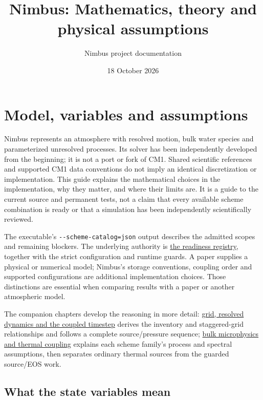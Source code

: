 \documentclass[
  11pt,
]{report}
\title{Nimbus: Mathematics, theory and physical assumptions}
\author{Nimbus project documentation}
\date{18 October 2026}
\begin{document}
\hypersetup{pageanchor=false}
\maketitle
\hypersetup{pageanchor=true}

{
\small
\setlength{\parskip}{0pt}
\setcounter{tocdepth}{1}
\tableofcontents
}
\clearpage
{}
\pagestyle{fancy}
\chapter{Model, variables and
assumptions}\label{model-variables-and-assumptions}

Nimbus represents an atmosphere with resolved motion, bulk water species
and parameterized unresolved processes. Its solver has been independently
developed from the beginning; it is not a port or fork of CM1. Shared
scientific references and supported CM1 data conventions do not imply an
identical discretization or implementation. This guide explains the
mathematical choices in the implementation, why they matter, and where
their limits are. It is a guide to the current source and permanent
tests, not a claim that every available scheme combination is ready or
that a simulation has been independently scientifically reviewed.

The executable's \texttt{-\/-scheme-catalog=json} output describes the
admitted scopes and remaining blockers. The underlying authority is
\href{../src/core/runtime/readiness.cpp}{the readiness registry},
together with the strict configuration and runtime guards. A paper
supplies a physical or numerical model; Nimbus's storage conventions,
coupling order and supported configurations are additional
implementation choices. Those distinctions are essential when comparing
results with a paper or another atmospheric model.

The companion chapters develop the reasoning in more detail:
\hyperref[grid-theory]{grid, resolved dynamics and the coupled timestep}
derives the inventory and staggered-grid relationships and follows a
complete source/pressure sequence; \hyperref[microphysics-theory]{bulk
microphysics and thermal coupling} explains each scheme family's process
and spectral assumptions, then separates ordinary thermal sources from
the guarded source/EOS work.

\section{What the state variables
mean}\label{what-the-state-variables-mean}
\end{document}

